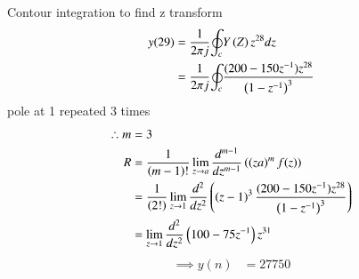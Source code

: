 \documentclass[journal,12pt,twocolumn]{IEEEtran}
\theoremstyle{remark}
\begin{document}
Contour integration to find z transform
\begin{align}
y(29)&=\frac{1}{2{\pi}j}{\oint_c}Y\left(Z\right)z^{28}dz\\
&=\frac{1}{2{\pi}j}{\oint_c}{\frac{(200-150z^{-1})z^{28}}{\left(1-z^{-1}\right)^{3}}}
\end{align}
pole at 1 repeated 3 times
\begin{align}
\therefore m&=3\\
R&=\frac{1}{\left(m-1\right)!}\lim_{z\to a}\frac{d^{m-1}}{dz^{m-1}}\left(\left(z
a\right)^mf{\left(z\right)}\right)\\
&=\frac{1}{\left(2!\right)}\lim_{z\to 1}\frac{d^2}{dz^2}\left(\left(z-1\right)^{3}\frac{(200-150z^{-1})z^{28}}{\left(1-z^{-1}\right)^3}\right)\\
&=\lim_{z\to1}\frac{d^2}{dz^2}\left(100-75z^{-1}\right)z^{31}
\end{align}
\begin{align}
\implies y(n)&=27750
\end{align}
\end{document}
